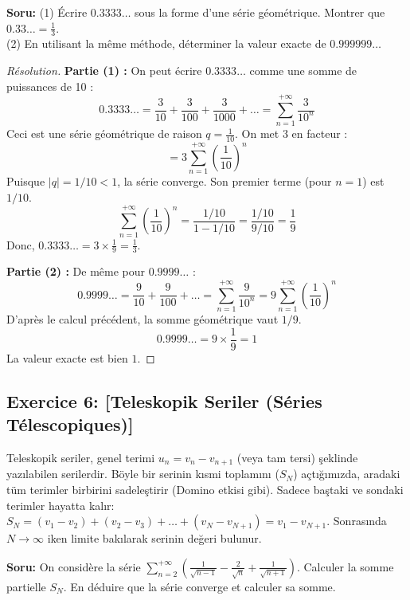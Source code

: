 \documentclass[12pt,a4paper]{report}
\begin{document}
\textbf{Soru:}
(1) Écrire $0.3333\dots$ sous la forme d'une série géométrique. Montrer que $0.33\dots = \frac{1}{3}$.\\
(2) En utilisant la même méthode, déterminer la valeur exacte de $0.999999\dots$

\begin{proof}[Résolution]
\textbf{Partie (1) :}
On peut écrire $0.3333\dots$ comme une somme de puissances de 10 :
\[ 0.3333\dots = \frac{3}{10} + \frac{3}{100} + \frac{3}{1000} + \dots = \sum_{n=1}^{+\infty} \frac{3}{10^n} \]
Ceci est une série géométrique de raison $q = \frac{1}{10}$. On met 3 en facteur :
\[ = 3 \sum_{n=1}^{+\infty} \left(\frac{1}{10}\right)^n \]
Puisque $|q| = 1/10 < 1$, la série converge. Son premier terme (pour $n=1$) est $1/10$.
\[ \sum_{n=1}^{+\infty} \left(\frac{1}{10}\right)^n = \frac{1/10}{1 - 1/10} = \frac{1/10}{9/10} = \frac{1}{9} \]
Donc, $0.3333\dots = 3 \times \frac{1}{9} = \frac{1}{3}$.

\textbf{Partie (2) :}
De même pour $0.9999\dots$ :
\[ 0.9999\dots = \frac{9}{10} + \frac{9}{100} + \dots = \sum_{n=1}^{+\infty} \frac{9}{10^n} = 9 \sum_{n=1}^{+\infty} \left(\frac{1}{10}\right)^n \]
D'après le calcul précédent, la somme géométrique vaut $1/9$.
\[ 0.9999\dots = 9 \times \frac{1}{9} = 1 \]
La valeur exacte est bien $1$.
\end{proof}

\subsection*{Exercice 6: [Teleskopik Seriler (Séries Télescopiques)]}

\begin{tcolorbox}[colback=cyan!5!white,colframe=cyan!75!black,title=Hatırlatma (Rappel): Teleskopik Seri]
Teleskopik seriler, genel terimi $u_n = v_{n} - v_{n+1}$ (veya tam tersi) şeklinde yazılabilen serilerdir. Böyle bir serinin kısmi toplamını ($S_N$) açtığımızda, aradaki tüm terimler birbirini sadeleştirir (Domino etkisi gibi).
Sadece baştaki ve sondaki terimler hayatta kalır:
$S_N = (v_1 - v_2) + (v_2 - v_3) + \dots + (v_N - v_{N+1}) = v_1 - v_{N+1}$.
Sonrasında $N \to \infty$ iken limite bakılarak serinin değeri bulunur.
\end{tcolorbox}

\textbf{Soru:}
On considère la série $\sum_{n=2}^{+\infty} \left( \frac{1}{\sqrt{n-1}} - \frac{2}{\sqrt{n}} + \frac{1}{\sqrt{n+1}} \right)$.
Calculer la somme partielle $S_N$. En déduire que la série converge et calculer sa somme.
\end{document}
